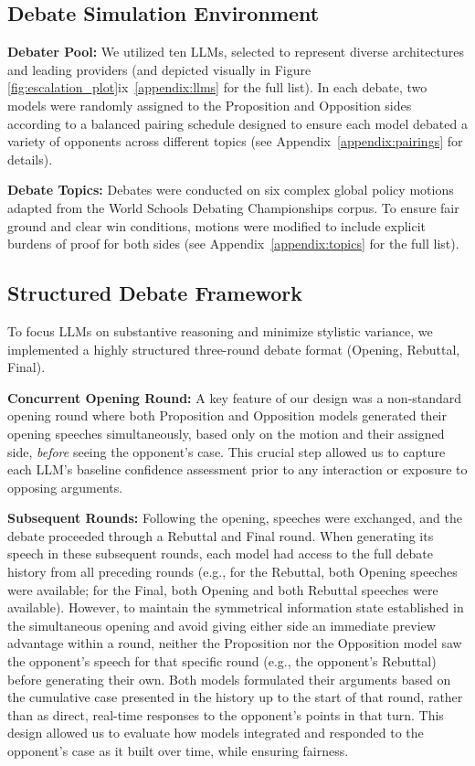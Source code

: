 \documentclass{article}
\begin{document}
\subsection{Debate Simulation Environment}
\label{subsec:debate_env}

\textbf{Debater Pool:} We utilized ten LLMs, selected to represent diverse architectures and leading providers (and depicted visually in Figure \ref{fig:escalation_plot}ix~\ref{appendix:llms} for the full list). In each debate, two models were randomly assigned to the Proposition and Opposition sides according to a balanced pairing schedule designed to ensure each model debated a variety of opponents across different topics (see Appendix~\ref{appendix:pairings} for details).

\textbf{Debate Topics:} Debates were conducted on six complex global policy motions adapted from the World Schools Debating Championships corpus. To ensure fair ground and clear win conditions, motions were modified to include explicit burdens of proof for both sides (see Appendix~\ref{appendix:topics} for the full list).

\subsection{Structured Debate Framework}
\label{subsec:debate_framework}

To focus LLMs on substantive reasoning and minimize stylistic variance, we implemented a highly structured three-round debate format (Opening, Rebuttal, Final).

\textbf{Concurrent Opening Round:} A key feature of our design was a non-standard opening round where both Proposition and Opposition models generated their opening speeches simultaneously, based only on the motion and their assigned side, \textit{before} seeing the opponent's case. This crucial step allowed us to capture each LLM's baseline confidence assessment prior to any interaction or exposure to opposing arguments.

\textbf{Subsequent Rounds:} Following the opening, speeches were exchanged, and the debate proceeded through a Rebuttal and Final round. When generating its speech in these subsequent rounds, each model had access to the full debate history from all preceding rounds (e.g., for the Rebuttal, both Opening speeches were available; for the Final, both Opening and both Rebuttal speeches were available). However, to maintain the symmetrical information state established in the simultaneous opening and avoid giving either side an immediate preview advantage within a round, neither the Proposition nor the Opposition model saw the opponent's speech for that specific round (e.g., the opponent's Rebuttal) before generating their own. Both models formulated their arguments based on the cumulative case presented in the history up to the start of that round, rather than as direct, real-time responses to the opponent's points in that turn. This design allowed us to evaluate how models integrated and responded to the opponent's case as it built over time, while ensuring fairness.
\end{document}
